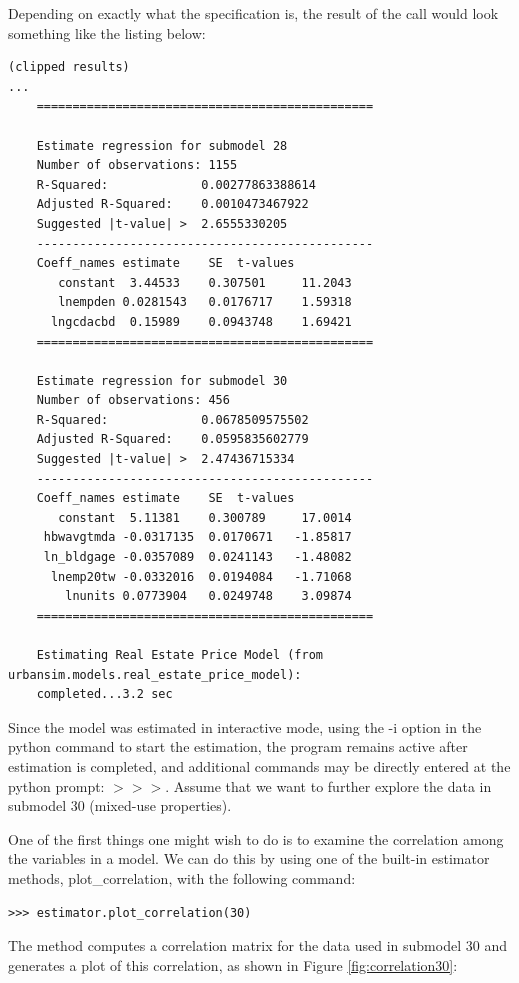 Depending on exactly what the specification is, the result of the call 
would look something like the listing below:
\\

\begin{verbatim}
(clipped results)
...
    ===============================================

    Estimate regression for submodel 28
    Number of observations: 1155
    R-Squared:             0.00277863388614
    Adjusted R-Squared:    0.0010473467922
    Suggested |t-value| >  2.6555330205
    -----------------------------------------------
    Coeff_names	estimate	SE	t-values
       constant	 3.44533	0.307501	 11.2043
       lnempden	0.0281543	0.0176717	 1.59318
      lngcdacbd	 0.15989	0.0943748	 1.69421
    ===============================================

    Estimate regression for submodel 30
    Number of observations: 456
    R-Squared:             0.0678509575502
    Adjusted R-Squared:    0.0595835602779
    Suggested |t-value| >  2.47436715334
    -----------------------------------------------
    Coeff_names	estimate	SE	t-values
       constant	 5.11381	0.300789	 17.0014
     hbwavgtmda	-0.0317135	0.0170671	-1.85817
     ln_bldgage	-0.0357089	0.0241143	-1.48082
      lnemp20tw	-0.0332016	0.0194084	-1.71068
        lnunits	0.0773904	0.0249748	 3.09874
    ===============================================

    Estimating Real Estate Price Model (from urbansim.models.real_estate_price_model): 
    completed...3.2 sec
\end{verbatim}

Since the model was estimated in interactive mode, using the
-i option in the python command to start the estimation, the
program remains active after estimation is completed, and
additional commands may be directly entered at the python
prompt: $>>>$.  Assume that we want to further explore the
data in submodel 30 (mixed-use properties).

One of the first things one might wish to do is to examine
the correlation among the variables in a model.  We can do
this by using one of the built-in estimator methods,
plot\_correlation, with the following command:

\begin{verbatim}
>>> estimator.plot_correlation(30)
\end{verbatim}

The method computes a correlation matrix for the data used
in submodel 30 and generates a plot of this correlation, as
shown in Figure \ref{fig:correlation30}:

